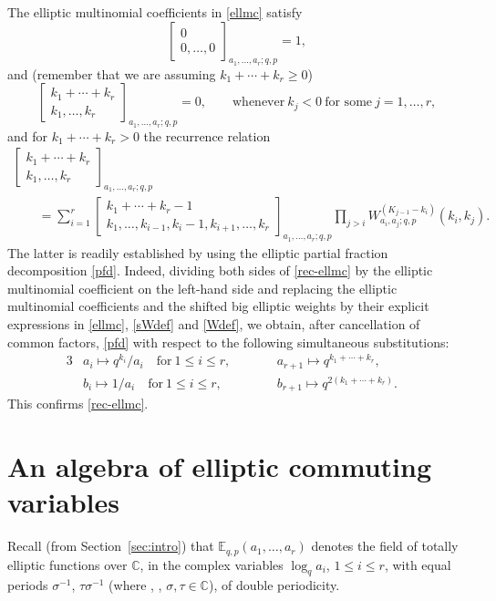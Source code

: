 \documentclass[pdftex]{sigma}
\numberwithin{equation}{section}
\theoremstyle{definition}
\newcommand{\C}{\mathbb C}
\newcommand{\E}{\mathbb E}
\begin{document}
The elliptic multinomial coefficients in \eqref{ellmc} satisfy
\[
 \begin{bmatrix}0\\0,\dots,0\end{bmatrix}_{a_1,\dots,a_r;q,p}
=1,
\]
and (remember that we are assuming $k_1+\cdots+k_r\ge 0$)
\[
 \begin{bmatrix}k_1+\cdots+k_r\\k_1,\dots,k_r\end{bmatrix}_{a_1,\dots,a_r;q,p}
=0,\qquad\text{whenever} \ k_j<0 \ \text{for some} \ j=1,\dots,r,
\]
and for $k_1+\cdots+k_r>0$
the recurrence relation
\begin{gather}
\begin{bmatrix}k_1+\cdots+k_r\\
 k_1,\dots,k_r\end{bmatrix}_{a_1,\dots,a_r;q,p}\nonumber\\
 \qquad=\sum_{i=1}^r
 \begin{bmatrix}k_1+\cdots+k_r-1\\k_1,\dots,k_{i-1},k_i-1,
 k_{i+1},\dots,k_r\end{bmatrix}_{a_1,\dots,a_r;q,p}
 \prod_{j>i}W_{a_i,a_j;q,p}^{(K_{j-1}-k_i)}(k_i,k_j).\label{rec-ellmc}
\end{gather}
The latter is readily established by using the elliptic
partial fraction decomposition \eqref{pfd}.
Indeed, dividing both sides of \eqref{rec-ellmc} by
the elliptic multinomial coefficient on the left-hand side and
replacing the elliptic multinomial coefficients and the shifted big
elliptic weights by their explicit expressions in \eqref{ellmc},
\eqref{sWdef} and \eqref{Wdef}, we obtain, after cancellation
of common factors, \eqref{pfd} with respect to the following simultaneous substitutions:
\begin{alignat*}{3}
 & a_i\mapsto q^{k_i}/a_i\quad\text{for}\ 1\le i\le r,\qquad&&
 a_{r+1}\mapsto q^{k_1+\cdots+k_r},&\\
 & b_i\mapsto 1/a_i\quad\text{for}\ 1\le i\le r,\qquad&&
 b_{r+1}\mapsto q^{2(k_1+\cdots+k_r)}.&
\end{alignat*}
This confirms \eqref{rec-ellmc}.

\section{An algebra of elliptic commuting variables}\label{sec:ellalg}

Recall (from Section~\ref{sec:intro})
that $\E_{q,p}(a_1,\dots,a_r)$
denotes the field of totally
elliptic functions over $\C$, in the complex variables
$\log_qa_i$, $1\le i\le r$, with equal periods $\sigma^{-1}$,
$\tau\sigma^{-1}$ (where , ,
$\sigma,\tau\in\C$), of double periodicity.
\end{document}
